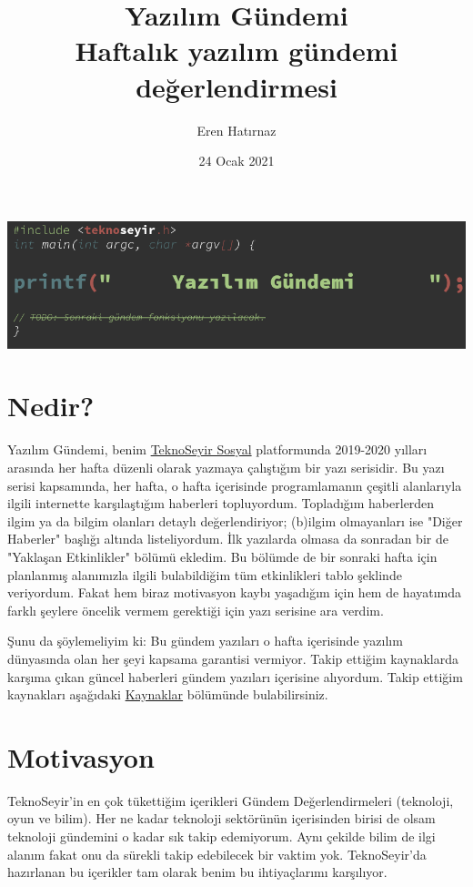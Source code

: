 \documentclass[11pt]{article}
\author{Eren Hatırnaz}
\date{24 Ocak 2021}
\title{Yazılım Gündemi\\\medskip
\large Haftalık yazılım gündemi değerlendirmesi}
\begin{document}
\maketitle
\shorthandoff{=}
\begin{center}
\includegraphics[width=.9\linewidth]{img/yazilim-gundemi-logo.png}
\end{center}

\section*{Nedir?}
\label{sec:orgb10dfbd}
Yazılım Gündemi, benim \href{https://teknoseyir.com/u/erenhatirnaz/blog}{TeknoSeyir Sosyal} platformunda 2019-2020 yılları
arasında her hafta düzenli olarak yazmaya çalıştığım bir yazı serisidir. Bu
yazı serisi kapsamında, her hafta, o hafta içerisinde programlamanın çeşitli
alanlarıyla ilgili internette karşılaştığım haberleri topluyordum. Topladığım
haberlerden ilgim ya da bilgim olanları detaylı değerlendiriyor; (b)ilgim
olmayanları ise "Diğer Haberler" başlığı altında listeliyordum. İlk yazılarda
olmasa da sonradan bir de "Yaklaşan Etkinlikler" bölümü ekledim. Bu bölümde de
bir sonraki hafta için planlanmış alanımızla ilgili bulabildiğim tüm
etkinlikleri tablo şeklinde veriyordum. Fakat hem biraz motivasyon kaybı
yaşadığım için hem de hayatımda farklı şeylere öncelik vermem gerektiği için
yazı serisine ara verdim.

Şunu da şöylemeliyim ki: Bu gündem yazıları o hafta içerisinde yazılım
dünyasında olan her şeyi kapsama garantisi vermiyor. Takip ettiğim
kaynaklarda karşıma çıkan güncel haberleri gündem yazıları içerisine
alıyordum. Takip ettiğim kaynakları aşağıdaki \hyperref[sec:orgb26d44d]{Kaynaklar} bölümünde
bulabilirsiniz.
\section*{Motivasyon}
\label{sec:org1dd7344}
TeknoSeyir'in en çok tükettiğim içerikleri Gündem Değerlendirmeleri
(teknoloji, oyun ve bilim). Her ne kadar teknoloji sektörünün içerisinden
birisi de olsam teknoloji gündemini o kadar sık takip edemiyorum. Aynı çekilde
bilim de ilgi alanım fakat onu da sürekli takip edebilecek bir vaktim yok.
TeknoSeyir'da hazırlanan bu içerikler tam olarak benim bu ihtiyaçlarımı
karşılıyor.
\end{document}
